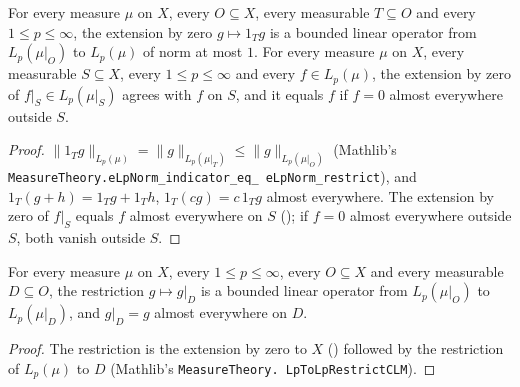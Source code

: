 \begin{lemma}
\label{lem:zero-extension-lp}
\leanok
{}
For every measure $\mu$ on $X$, every $O \subseteq X$, every measurable $T \subseteq O$ and every
$1 \leq p \leq \infty$, the extension by zero $g \mapsto 1_T g$ is a bounded linear operator
from $L_p(\mu|_O)$ to $L_p(\mu)$ of norm at most $1$. For every measure $\mu$ on $X$, every
measurable $S \subseteq X$, every $1 \leq p \leq \infty$ and every $f \in L_p(\mu)$, the
extension by zero of $f|_S \in L_p(\mu|_S)$ agrees with $f$ on $S$, and it equals $f$ if
$f = 0$ almost everywhere outside $S$.
\end{lemma}

\begin{proof}
\leanok
$\|1_T g\|_{L_p(\mu)} = \|g\|_{L_p(\mu|_T)} \leq \|g\|_{L_p(\mu|_O)}$ (Mathlib's
\texttt{MeasureTheory.\allowbreak eLpNorm\_\allowbreak indicator\_\allowbreak eq\_\allowbreak
eLpNorm\_\allowbreak restrict}), and $1_T (g + h) = 1_T g + 1_T h$, $1_T (c g) = c \, 1_T g$
almost everywhere. The extension by zero of $f|_S$ equals $f$ almost everywhere on $S$
(); if $f = 0$ almost everywhere outside $S$, both vanish
outside $S$.
\end{proof}

\begin{lemma}
\label{lem:restriction-smaller-set}
\leanok
{}
For every measure $\mu$ on $X$, every $1 \leq p \leq \infty$, every $O \subseteq X$ and every
measurable $D \subseteq O$, the restriction $g \mapsto g|_D$ is a bounded linear operator from
$L_p(\mu|_O)$ to $L_p(\mu|_D)$, and $g|_D = g$ almost everywhere on $D$.
\end{lemma}

\begin{proof}
\leanok
The restriction is the extension by zero to $X$ () followed by the
restriction of $L_p(\mu)$ to $D$ (Mathlib's \texttt{MeasureTheory.\allowbreak
LpToLpRestrictCLM}).
\end{proof}


